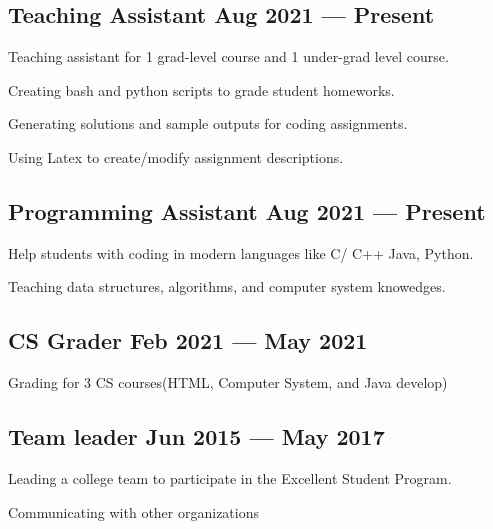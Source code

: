 \documentclass[letter,10pt]{article}
\begin{document}
\subsection{{Teaching Assistant \hfill Aug 2021 --- Present}}
\begin{zitemize}
    \item Teaching assistant for 1 grad-level course and 1 under-grad level course.
    \item Creating bash and python scripts to grade student homeworks.
    \item Generating solutions and sample outputs for coding assignments.
    \item Using Latex to create/modify assignment descriptions.
\end{zitemize}


\subsection{{Programming Assistant \hfill Aug 2021 --- Present}}
\begin{zitemize}
    \item Help students with coding in modern languages like C/ C++ Java, Python.
    \item Teaching data structures, algorithms, and computer system knowedges.
\end{zitemize}


\subsection{{CS Grader \hfill Feb 2021 --- May 2021}}
\begin{zitemize}
    \item Grading for 3 CS courses(HTML, Computer System, and Java develop)
\end{zitemize}


\subsection{{Team leader \hfill Jun 2015 --- May 2017}}
\begin{zitemize}
    \item Leading a college team to participate in the Excellent Student Program.
    \item Communicating with other organizations
\end{zitemize}
\end{document}
